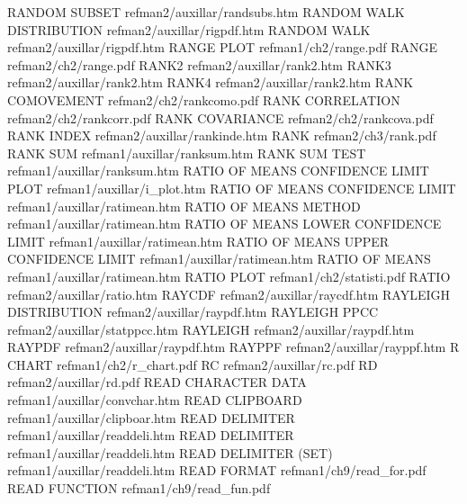 RANDOM SUBSET                           refman2/auxillar/randsubs.htm
RANDOM WALK DISTRIBUTION                refman2/auxillar/rigpdf.htm
RANDOM WALK                             refman2/auxillar/rigpdf.htm
RANGE PLOT                              refman1/ch2/range.pdf
RANGE                                   refman2/ch2/range.pdf
RANK2                                   refman2/auxillar/rank2.htm
RANK3                                   refman2/auxillar/rank2.htm
RANK4                                   refman2/auxillar/rank2.htm
RANK COMOVEMENT                         refman2/ch2/rankcomo.pdf
RANK CORRELATION                        refman2/ch2/rankcorr.pdf
RANK COVARIANCE                         refman2/ch2/rankcova.pdf
RANK INDEX                              refman2/auxillar/rankinde.htm
RANK                                    refman2/ch3/rank.pdf
RANK SUM                                refman1/auxillar/ranksum.htm
RANK SUM TEST                           refman1/auxillar/ranksum.htm
RATIO OF MEANS CONFIDENCE LIMIT PLOT    refman1/auxillar/i_plot.htm
RATIO OF MEANS CONFIDENCE LIMIT         refman1/auxillar/ratimean.htm
RATIO OF MEANS METHOD                   refman1/auxillar/ratimean.htm
RATIO OF MEANS LOWER CONFIDENCE LIMIT   refman1/auxillar/ratimean.htm
RATIO OF MEANS UPPER CONFIDENCE LIMIT   refman1/auxillar/ratimean.htm
RATIO OF MEANS                          refman1/auxillar/ratimean.htm
RATIO PLOT                              refman1/ch2/statisti.pdf
RATIO                                   refman2/auxillar/ratio.htm
RAYCDF                                  refman2/auxillar/raycdf.htm
RAYLEIGH DISTRIBUTION                   refman2/auxillar/raypdf.htm
RAYLEIGH PPCC                           refman2/auxillar/statppcc.htm
RAYLEIGH                                refman2/auxillar/raypdf.htm
RAYPDF                                  refman2/auxillar/raypdf.htm
RAYPPF                                  refman2/auxillar/rayppf.htm
R CHART                                 refman1/ch2/r_chart.pdf
RC                                      refman2/auxillar/rc.pdf
RD                                      refman2/auxillar/rd.pdf
READ CHARACTER DATA                     refman1/auxillar/convchar.htm
READ CLIPBOARD                          refman1/auxillar/clipboar.htm
READ DELIMITER                          refman1/auxillar/readdeli.htm
READ DELIMITER                          refman1/auxillar/readdeli.htm
READ DELIMITER (SET)                    refman1/auxillar/readdeli.htm
READ FORMAT                             refman1/ch9/read_for.pdf
READ FUNCTION                           refman1/ch9/read_fun.pdf
